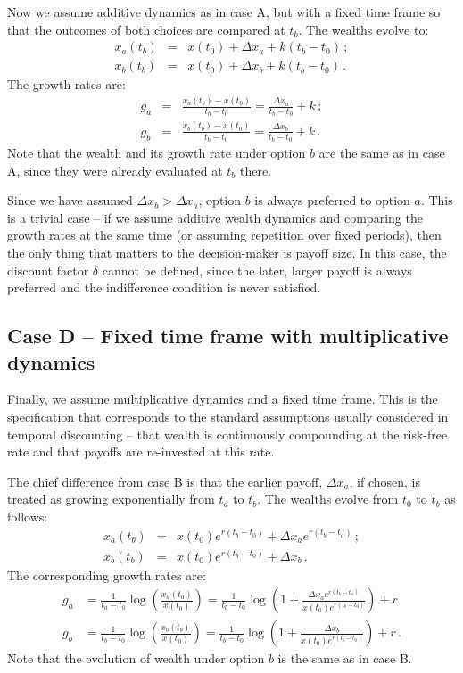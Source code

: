 \documentclass[11pt]{article}
\newcommand{\bea}{\begin{eqnarray}}
\newcommand{\eea}{\end{eqnarray}}
\newcommand{\Dx}{\Delta x}
\numberwithin{equation}{section}
\begin{document}
Now we assume additive dynamics as in case A, but with a fixed time frame so that the outcomes of both choices are compared at $t_b$. The wealths evolve to: \bea
x_a\left(t_b\right) &=& x\left(t_0\right) + \Dx_a + k(t_b-t_0)\,; \\
x_b\left(t_b\right) &=& x\left(t_0\right) + \Dx_b + k(t_b-t_0)\,.
\eea
The growth rates are:
\bea
g_a &=& \frac{x_a\left(t_b\right) - x\left(t_0\right)}{t_b-t_0} = \frac{\Dx_a}{t_b-t_0} + k\,;\\
g_b &=& \frac{x_b\left(t_b\right) - x\left(t_0\right)}{t_b-t_0} = \frac{\Dx_b}{t_b-t_0} + k\,.
\eea
Note that the wealth and its growth rate under option $b$ are the same as in case A, since they were already evaluated at $t_b$ there.

Since we have assumed $\Dx_b > \Dx_a$, option $b$ is always preferred to option $a$. This is a trivial case -- if we assume additive wealth dynamics and comparing the growth rates at the same time (or assuming repetition over fixed periods), then the only thing that matters to the decision-maker is payoff size. In this case, the discount factor $\delta$ cannot be defined, since the later, larger payoff is always preferred and the indifference condition is never satisfied.

\subsection{Case D -- Fixed time frame with multiplicative dynamics}\label{sec:case_D}

Finally, we assume multiplicative dynamics and a fixed time frame. This is the specification that corresponds to the standard assumptions usually considered in temporal discounting -- that wealth is continuously compounding at the risk-free rate and that payoffs are re-invested at this rate.

The chief difference from case B is that the earlier payoff, $\Dx_a$, if chosen, is treated as growing exponentially from $t_a$ to $t_b$. The wealths evolve from $t_0$ to $t_b$ as follows:
\bea
x_a\left(t_b\right) &=& x\left(t_0\right) e^{r(t_b-t_0)} + \Dx_a e^{r(t_b-t_a)}\,;\\
x_b\left(t_b\right) &=& x\left(t_0\right) e^{r(t_b-t_0)} + \Dx_b\,.
\eea
The corresponding growth rates are:
\bea
g_a &= \frac{1}{t_a-t_0} \log{\left(\frac{x_a\left(t_a\right)}{x\left(t_0\right)}\right)} = \frac{1}{t_b-t_0}\log{\left(1 + \frac{\Dx_a e^{r(t_b-t_a)}}{x\left(t_0\right)e^{r(t_b-t_0)}}\right)} + r\\
g_b &= \frac{1}{t_b-t_0} \log{\left(\frac{x_b\left(t_b\right)}{x\left(t_0\right)}\right)} = \frac{1}{t_b-t_0}\log{\left(1 + \frac{\Dx_b}{x\left(t_0\right)e^{r(t_b-t_0)}}\right)} + r\,.
\eea
Note that the evolution of wealth under option $b$ is the same as in case B.
\end{document}
